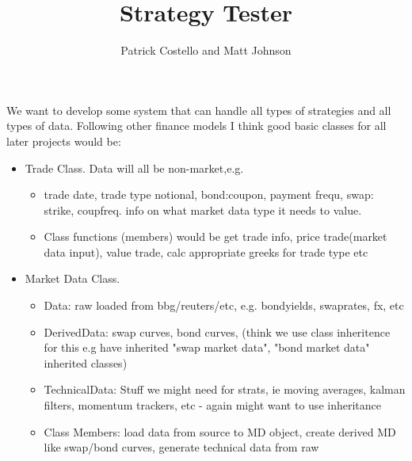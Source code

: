 \documentclass{article}\usepackage{graphicx, color}
\title{Strategy Tester}
\author{Patrick Costello and Matt Johnson}
\begin{document}
\maketitle
We want to develop some system that can handle all types of strategies and all types of data. Following other finance models I think good basic classes for all later projects would be:
\begin{itemize}

\item Trade Class. Data will all be non-market,e.g. 

  \begin{itemize}
  
    \item trade date, trade type notional, bond:coupon, payment frequ, swap: strike, coupfreq. info on what market data type it needs to value. 
    \item Class functions (members) would be get trade info, price trade(market data input), value trade, calc appropriate greeks for trade type etc
  
  \end{itemize}
  
  \item Market Data Class.
  
    \begin{itemize}
    
      \item Data: raw loaded from bbg/reuters/etc, e.g. bondyields, swaprates, fx, etc
      \item DerivedData: swap curves, bond curves, (think we use class inheritence for this e.g have inherited "swap market data", "bond market data" inherited classes)
      \item TechnicalData: Stuff we might need for strats, ie moving averages, kalman filters, momentum trackers, etc - again might want to use inheritance
      \item Class Members: load data from source to MD object, create derived MD like swap/bond curves, generate technical data from raw
    \end{itemize}

\end{itemize}
\end{document}
